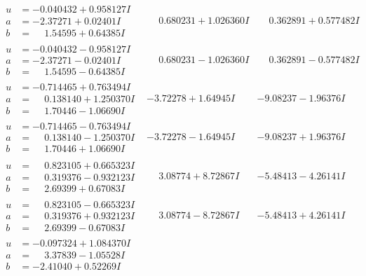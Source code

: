 \documentclass[1p]{elsarticle_modified}
\theoremstyle{definition}
\begin{document}
$$\begin{array}{c|c|c}
\begin{aligned}
u &= -0.040432 + 0.958127 I \\
a &= -2.37271 + 0.02401 I \\
b &= \phantom{-}1.54595 + 0.64385 I\end{aligned}
 & \phantom{-}0.680231 + 1.026360 I & \phantom{-}0.362891 + 0.577482 I \\ \hline\begin{aligned}
u &= -0.040432 - 0.958127 I \\
a &= -2.37271 - 0.02401 I \\
b &= \phantom{-}1.54595 - 0.64385 I\end{aligned}
 & \phantom{-}0.680231 - 1.026360 I & \phantom{-}0.362891 - 0.577482 I \\ \hline\begin{aligned}
u &= -0.714465 + 0.763494 I \\
a &= \phantom{-}0.138140 + 1.250370 I \\
b &= \phantom{-}1.70446 - 1.06690 I\end{aligned}
 & -3.72278 + 1.64945 I & -9.08237 - 1.96376 I \\ \hline\begin{aligned}
u &= -0.714465 - 0.763494 I \\
a &= \phantom{-}0.138140 - 1.250370 I \\
b &= \phantom{-}1.70446 + 1.06690 I\end{aligned}
 & -3.72278 - 1.64945 I & -9.08237 + 1.96376 I \\ \hline\begin{aligned}
u &= \phantom{-}0.823105 + 0.665323 I \\
a &= \phantom{-}0.319376 - 0.932123 I \\
b &= \phantom{-}2.69399 + 0.67083 I\end{aligned}
 & \phantom{-}3.08774 + 8.72867 I & -5.48413 - 4.26141 I \\ \hline\begin{aligned}
u &= \phantom{-}0.823105 - 0.665323 I \\
a &= \phantom{-}0.319376 + 0.932123 I \\
b &= \phantom{-}2.69399 - 0.67083 I\end{aligned}
 & \phantom{-}3.08774 - 8.72867 I & -5.48413 + 4.26141 I \\ \hline\begin{aligned}
u &= -0.097324 + 1.084370 I \\
a &= \phantom{-}3.37839 - 1.05528 I \\
b &= -2.41040 + 0.52269 I\end{aligned}

\end{array}$$
\end{document}
